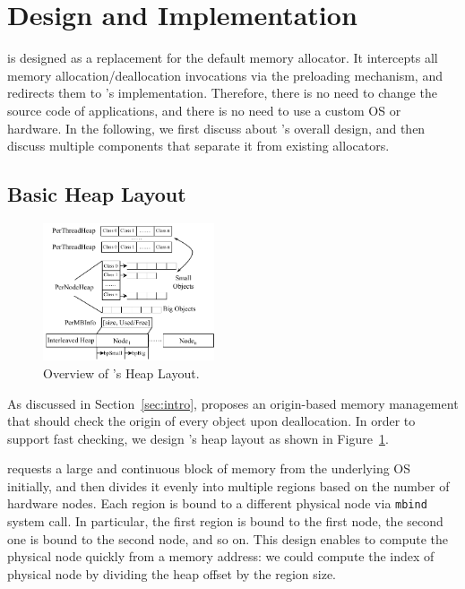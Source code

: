 \section{Design and Implementation}
\label{sec:implement}

\NM{} is designed as a replacement for the default memory allocator. It intercepts all memory allocation/deallocation invocations via the preloading mechanism, and redirects them to \NM{}'s implementation. Therefore, there is no need to change the source code of applications, and there is no need to use a custom OS or hardware. In the following, we first discuss about \NM{}'s overall design, and then discuss multiple components that separate it from existing allocators.

\subsection{Basic Heap Layout}
\label{sec:overview}

\begin{figure}[!ht]
\begin{center}
\includegraphics[width=0.45\textwidth]{figure/heaplayout1}
\end{center}
\caption{Overview of \NA{}'s Heap Layout.
\label{fig:overview}}
\end{figure}

As discussed in Section~\ref{sec:intro}, \NM{} proposes an origin-based memory management that should check the origin of every object upon deallocation. In order to support fast checking, we design \NM{}'s heap layout as shown in Figure~\ref{fig:overview}. 

\NM{} requests a large and continuous block of memory from the underlying OS initially, and then divides it evenly into multiple regions based on the number of hardware nodes. Each region is bound to a different physical node via \texttt{mbind} system call. 
In particular, the first region is bound to the first node, the second one is bound to the second node, and so on. This design enables to compute the physical node quickly from a memory address: we could compute the index of physical node by dividing the heap offset by the region size.

